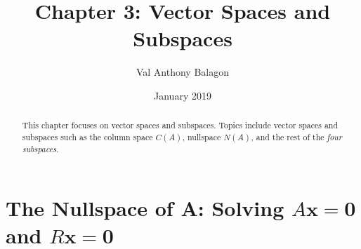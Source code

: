 \documentclass[letterpaper]{article}
\author{Val Anthony Balagon}
\date{January 2019}
\title{Chapter 3: Vector Spaces and Subspaces}
\begin{document}
	\maketitle
	\begin{abstract}
		This chapter focuses on vector spaces and subspaces. Topics include vector spaces and subspaces such as the column space $C(A)$, nullspace $N(A)$, and the rest of the \emph{four subspaces}.
	\end{abstract}
\section{The Nullspace of A: Solving $A\textbf{x} = \textbf{0}$ and $R\textbf{x} = \textbf{0}$}
\end{document}
